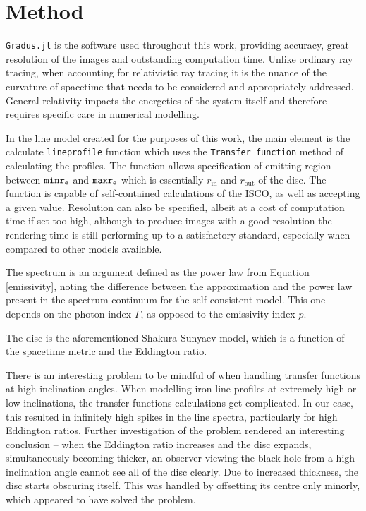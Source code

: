\documentclass[fleqn,usenatbib,useAMS]{mnras}
\begin{document}
\section{Method} 

{\tt Gradus.jl} \cite{baker2022} is the software used throughout this work, providing accuracy, great resolution of the images and outstanding computation time. Unlike ordinary ray tracing, when accounting for relativistic ray tracing it is the nuance of the curvature of spacetime that needs to be considered and appropriately addressed. General relativity impacts the energetics of the system itself and therefore requires specific care in numerical modelling.

In the line model created for the purposes of this work, the main element is the calculate {\tt lineprofile} function which uses the {\tt Transfer function} method of calculating the profiles. The function allows specification of emitting region between ${\tt minr_{e}}$ and ${\tt maxr_{e}}$ which is essentially $r_{\text{in}}$ and $r_{\text{out}}$ of the disc. The function is capable of self-contained calculations of the ISCO, as well as accepting a given value. Resolution can also be specified, albeit at a cost of computation time if set too high, although to produce images with a good resolution the rendering time is still performing up to a satisfactory standard, especially when compared to other models available.


The spectrum is an argument defined as the power law from Equation \ref{emissivity}, noting the difference between the approximation and the power law present in the spectrum continuum for the self-consistent model. This one depends on the photon index $\Gamma$, as opposed to the emissivity index $p$. 

The disc is the aforementioned Shakura-Sunyaev \cite{shakura1973black} model, which is a function of the spacetime metric and the Eddington ratio.

There is an interesting problem to be mindful of when handling transfer functions at high inclination angles. When modelling iron line profiles at extremely high or low inclinations, the transfer functions calculations get complicated. In our case, this resulted in infinitely high spikes in the line spectra, particularly for high Eddington ratios. Further investigation of the problem rendered an interesting conclusion -- when the Eddington ratio increases and the disc expands, simultaneously becoming thicker, an observer viewing the black hole from a high inclination angle cannot see all of the disc clearly. Due to increased thickness, the disc starts obscuring itself. This was handled by offsetting its centre only minorly, which appeared to have solved the problem.
\end{document}
